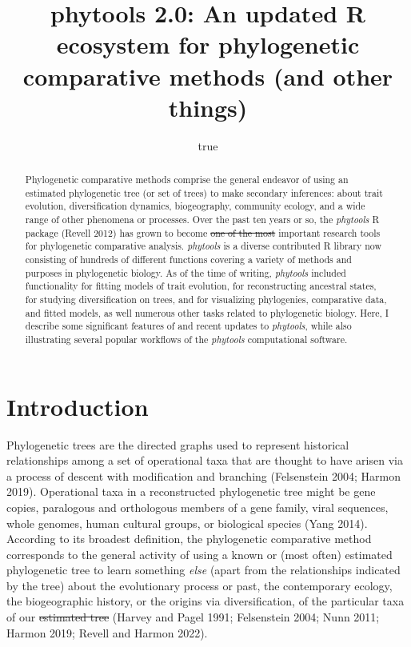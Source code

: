 \documentclass[fleqn,10pt,lineno]{wlpeerj}
\title{phytools 2.0: An updated R ecosystem for phylogenetic comparative
methods (and other things)}
\author{true}
\date{}
\providecommand{\DIFaddtex}[1]{{\protect\color{blue}\uwave{#1}}} %
\providecommand{\DIFdeltex}[1]{{\protect\color{red}\sout{#1}}}                      %
\providecommand{\DIFaddbegin}{} %
\providecommand{\DIFaddend}{} %
\providecommand{\DIFdelbegin}{} %
\providecommand{\DIFdelend}{} %
\providecommand{\DIFadd}[1]{\texorpdfstring{\DIFaddtex{#1}}{#1}} %
\providecommand{\DIFdel}[1]{\texorpdfstring{\DIFdeltex{#1}}{}} %
\newcommand{\DIFscaledelfig}{0.5}
\newlength{\DIFdelgraphicswidth} %
\newlength{\DIFdelgraphicsheight} %
\newcommand{\DIFaddincludegraphics}[2][]{{\color{blue}\fbox{\DIFOincludegraphics[#1]{#2}}}} %
\newcommand{\DIFdelincludegraphics}[2][]{%
\sbox{\DIFdelgraphicsbox}{\DIFOincludegraphics[#1]{#2}}%
\settoboxwidth{\DIFdelgraphicswidth}{\DIFdelgraphicsbox} %
\settoboxtotalheight{\DIFdelgraphicsheight}{\DIFdelgraphicsbox} %
\scalebox{\DIFscaledelfig}{%
\parbox[b]{\DIFdelgraphicswidth}{\usebox{\DIFdelgraphicsbox}\\[-\baselineskip] \rule{\DIFdelgraphicswidth}{0em}}\llap{\resizebox{\DIFdelgraphicswidth}{\DIFdelgraphicsheight}{%
\setlength{\unitlength}{\DIFdelgraphicswidth}%
\begin{picture}(1,1)%
\thicklines\linethickness{2pt} %
{\color[rgb]{1,0,0}\put(0,0){\framebox(1,1){}}}%
{\color[rgb]{1,0,0}\put(0,0){\line( 1,1){1}}}%
{\color[rgb]{1,0,0}\put(0,1){\line(1,-1){1}}}%
\end{picture}%
}\hspace*{3pt}}} %
} %
\DeclareRobustCommand{\DIFaddbegin}{\DIFOaddbegin \let\includegraphics\DIFaddincludegraphics} %
\DeclareRobustCommand{\DIFaddend}{\DIFOaddend \let\includegraphics\DIFOincludegraphics} %
\DeclareRobustCommand{\DIFdelbegin}{\DIFOdelbegin \let\includegraphics\DIFdelincludegraphics} %
\DeclareRobustCommand{\DIFdelend}{\DIFOaddend \let\includegraphics\DIFOincludegraphics} %
\begin{document}
\maketitle
\begin{abstract}
Phylogenetic comparative methods comprise the general endeavor of using
an estimated phylogenetic tree (or set of trees) to make secondary
inferences: about trait evolution, diversification dynamics,
biogeography, community ecology, and a wide range of other phenomena or
processes. Over the past ten years or so, the \emph{phytools} R package
(Revell 2012) has grown to become \DIFdelbegin \DIFdel{one of the most }\DIFdelend \DIFaddbegin \DIFadd{an }\DIFaddend important research tools for
phylogenetic comparative analysis. \emph{phytools} is a diverse
contributed R library now consisting of hundreds of different functions
covering a variety of methods and purposes in phylogenetic biology. As
of the time of writing, \emph{phytools} included functionality for
fitting models of trait evolution, for reconstructing ancestral states,
for studying diversification on trees, and for visualizing phylogenies,
comparative data, and fitted models, as well numerous other tasks
related to phylogenetic biology. Here, I describe some significant
features of and recent updates to \emph{phytools}, while also
illustrating several popular workflows of the \emph{phytools}
computational software.
\end{abstract}

\hypertarget{introduction}{%
\section{Introduction}\label{introduction}}

Phylogenetic trees are the directed graphs used to represent historical
relationships among a set of operational taxa that are thought to have
arisen via a process of descent with modification and branching
(Felsenstein 2004; Harmon 2019). Operational taxa in a reconstructed
phylogenetic tree might be gene copies, paralogous and orthologous
members of a gene family, viral sequences, whole genomes, human cultural
groups, or biological species (\DIFaddbegin \DIFadd{Nunn 2011; }\DIFaddend Yang 2014). According to its
broadest definition, the phylogenetic comparative method corresponds to
the general activity of using a known or (most often) estimated
phylogenetic tree to learn something \emph{else} (apart from the
relationships indicated by the tree) about the evolutionary process or
past, the contemporary ecology, the biogeographic history, or the
origins via diversification, of the particular taxa of our \DIFdelbegin \DIFdel{estimated tree }\DIFdelend \DIFaddbegin \DIFadd{phylogeny
}\DIFaddend (Harvey and Pagel 1991; Felsenstein 2004; Nunn 2011; \DIFaddbegin \DIFadd{OMeara 2012; }\DIFaddend Harmon
2019; Revell and Harmon 2022).
\end{document}
